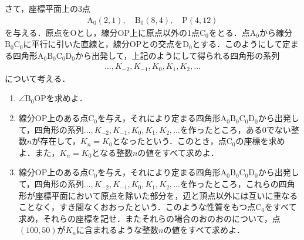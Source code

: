 \documentclass[../../main.tex]{subfiles}
\begin{document}
さて，座標平面上の$3$点
\begin{align}
  \text{A}_0(2, 1), \quad \text{B}_0(8, 4), \quad \text{P}(4, 12)
\end{align}
を与える．原点を$\text{O}$とし，線分$\text{OP}$上に原点以外の1点$\text{C}_0$をとる．点$\text{A}_0$から線分$\text{B}_0 \text{C}_0$に平行に引いた直線と，線分$\text{OP}$との交点を$\text{D}_0$とする．このようにして定まる四角形$\text{A}_0 \text{B}_0 \text{C}_0 \text{D}_0$から出発して，上記のようにして得られる四角形の系列
\begin{align}
  \dots, K_{-2}, K_{-1}, K_0, K_1, K_2, \dots
\end{align}
について考える．
\begin{enumerate}
  \item $\angle \text{B}_0\text{O}\text{P}$を求めよ．
  \item 線分$\text{OP}$上のある点$\text{C}_0$を与え，それにより定まる四角形$\text{A}_0 \text{B}_0 \text{C}_0 \text{D}_0$から出発して，四角形の系列$\dots, K_{-2}, K_{-1}, K_0, K_1, K_2, \dots$を作ったところ，ある0でない整数$n$が存在して，$K_n = K_0$となったという．このとき，点$\text{C}_0$の座標を求めよ．また，$K_n = K_0$となる整数$n$の値をすべて求めよ．
  \item 線分$\text{OP}$上のある点$\text{C}_0$を与え，それにより定まる四角形$\text{A}_0 \text{B}_0 \text{C}_0 \text{D}_0$から出発して，四角形の系列$\dots, K_{-2}, K_{-1}, K_0, K_1, K_2, \dots$を作ったところ，これらの四角形が座標平面において原点を除いた部分を，辺と頂点以外には互いに重なることなく，すき間なくおおったという．このような性質をもつ点$\text{C}_0$をすべて求め，それらの座標を記せ．またそれらの場合のおのおのについて，点$(100, 50)$が$K_n$に含まれるような整数$n$の値をすべて求めよ．
\end{enumerate}

\begin{figure}[H]
  \centering
\end{figure}
\end{document}
